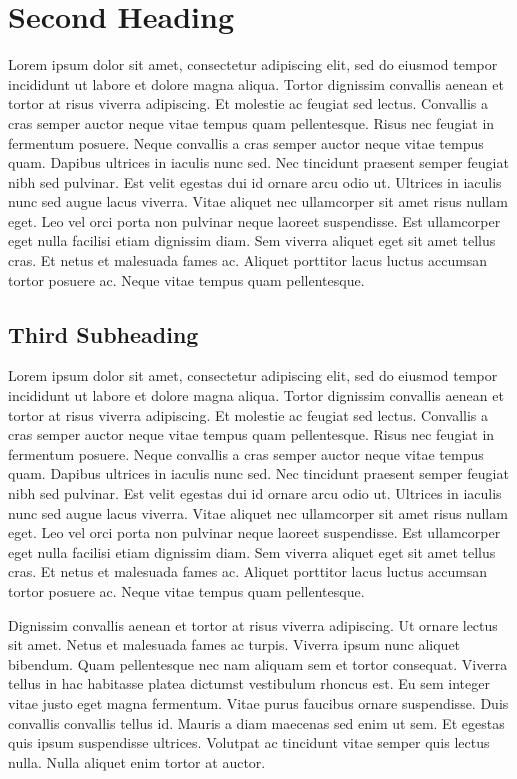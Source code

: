 \documentclass[a4paper]{article}
\begin{document}
\section{Second Heading}
Lorem ipsum dolor sit amet, consectetur adipiscing elit, sed do eiusmod tempor incididunt ut labore et dolore magna aliqua. Tortor dignissim convallis aenean et tortor at risus viverra adipiscing. Et molestie ac feugiat sed lectus. Convallis a cras semper auctor neque vitae tempus quam pellentesque. Risus nec feugiat in fermentum posuere. Neque convallis a cras semper auctor neque vitae tempus quam. Dapibus ultrices in iaculis nunc sed. Nec tincidunt praesent semper feugiat nibh sed pulvinar. Est velit egestas dui id ornare arcu odio ut. Ultrices in iaculis nunc sed augue lacus viverra. Vitae aliquet nec ullamcorper sit amet risus nullam eget. Leo vel orci porta non pulvinar neque laoreet suspendisse. Est ullamcorper eget nulla facilisi etiam dignissim diam. Sem viverra aliquet eget sit amet tellus cras. Et netus et malesuada fames ac. Aliquet porttitor lacus luctus accumsan tortor posuere ac. Neque vitae tempus quam pellentesque.

\subsection{Third Subheading}
Lorem ipsum dolor sit amet, consectetur adipiscing elit, sed do eiusmod tempor incididunt ut labore et dolore magna aliqua. Tortor dignissim convallis aenean et tortor at risus viverra adipiscing. Et molestie ac feugiat sed lectus. Convallis a cras semper auctor neque vitae tempus quam pellentesque. Risus nec feugiat in fermentum posuere. Neque convallis a cras semper auctor neque vitae tempus quam. Dapibus ultrices in iaculis nunc sed. Nec tincidunt praesent semper feugiat nibh sed pulvinar. Est velit egestas dui id ornare arcu odio ut. Ultrices in iaculis nunc sed augue lacus viverra. Vitae aliquet nec ullamcorper sit amet risus nullam eget. Leo vel orci porta non pulvinar neque laoreet suspendisse. Est ullamcorper eget nulla facilisi etiam dignissim diam. Sem viverra aliquet eget sit amet tellus cras. Et netus et malesuada fames ac. Aliquet porttitor lacus luctus accumsan tortor posuere ac. Neque vitae tempus quam pellentesque.

Dignissim convallis aenean et tortor at risus viverra adipiscing. Ut ornare lectus sit amet. Netus et malesuada fames ac turpis. Viverra ipsum nunc aliquet bibendum. Quam pellentesque nec nam aliquam sem et tortor consequat. Viverra tellus in hac habitasse platea dictumst vestibulum rhoncus est. Eu sem integer vitae justo eget magna fermentum. Vitae purus faucibus ornare suspendisse. Duis convallis convallis tellus id. Mauris a diam maecenas sed enim ut sem. Et egestas quis ipsum suspendisse ultrices. Volutpat ac tincidunt vitae semper quis lectus nulla. Nulla aliquet enim tortor at auctor.
\end{document}
